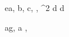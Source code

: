 \begin{eqcode}{e}{a, b, c}{, , ^2}{}
  d \in {} \lend
  d \gets {} \lend %
\end{eqcode}

\begin{eqcode}{a}{g, a }{, }{}
  
\end{eqcode}
